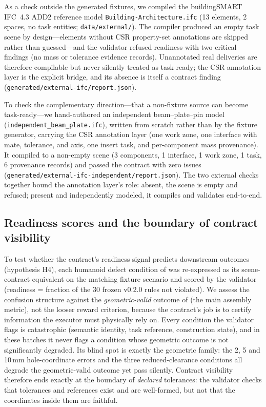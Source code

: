 As a check outside the generated fixtures, we compiled the buildingSMART
IFC~4.3 ADD2 reference model \texttt{Building-Architecture.ifc} (13 elements,
2 spaces, no task entities; \texttt{data/external/}). The compiler produced an
empty task scene by design---elements without CSR property-set annotations are
skipped rather than guessed---and the validator refused readiness with two
critical findings (no mass or tolerance evidence records). Unannotated real
deliveries are therefore compilable but never silently treated as task-ready;
the CSR annotation layer is the explicit bridge, and its absence is itself a
contract finding (\texttt{generated/external-ifc/report.json}).

To check the complementary direction---that a non-fixture source can become
task-ready---we hand-authored an independent beam--plate--pin model
(\texttt{independent\_beam\_plate.ifc}), written from scratch rather than by
the fixture generator, carrying the CSR annotation layer (one work zone, one
interface with mate, tolerance, and axis, one insert task, and per-component
mass provenance). It compiled to a non-empty scene (3 components, 1
interface, 1 work zone, 1 task, 6 provenance records) and passed the contract
with zero issues (\texttt{generated/external-ifc-independent/report.json}).
The two external checks together bound the annotation layer's role: absent,
the scene is empty and refused; present and independently modeled, it
compiles and validates end-to-end.

\subsection{Readiness scores and the boundary of contract visibility}
\label{sec:readiness-link}

To test whether the contract's readiness signal predicts downstream outcomes
(hypothesis H4), each humanoid defect condition of 
was re-expressed as its scene-contract equivalent on the matching fixture
scenario and scored by the validator (readiness = fraction of the 30 frozen
v0.2.0 rules not violated). We assess the confusion structure against the
\emph{geometric-valid} outcome of  (the main assembly
metric), not the looser reward criterion, because the contract's job is to
certify information the executor must physically rely on. Every condition the
validator flags is catastrophic (semantic identity, task reference,
construction state), and in these batches it never flags a condition whose
geometric outcome is not significantly degraded. Its blind spot is exactly
the geometric family: the 2, 5 and 10\,mm hole-coordinate errors and the
three reduced-clearance conditions all degrade the geometric-valid outcome
yet pass silently. Contract visibility therefore ends exactly at the
boundary of \emph{declared} tolerances: the validator checks that tolerances
and references exist and are well-formed, but not that the coordinates
inside them are faithful.

